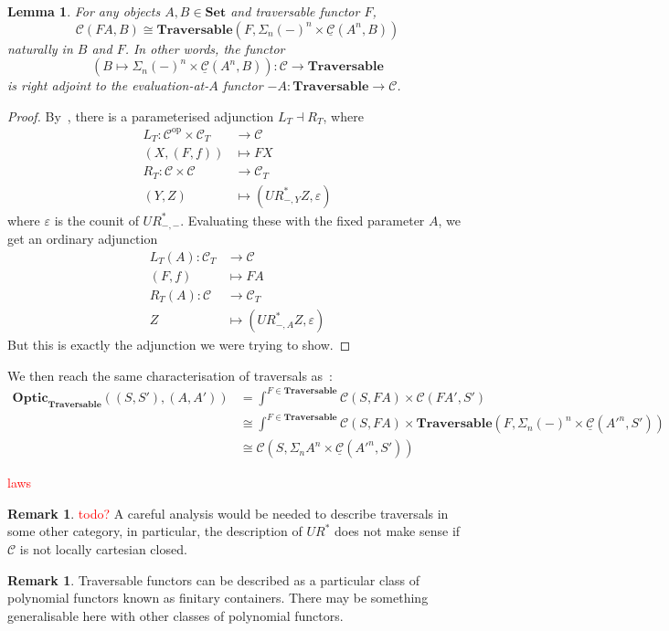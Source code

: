 \documentclass[11pt,a4paper]{article}
\theoremstyle{plain}
\newtheorem{lemma}[theorem]{Lemma}
\theoremstyle{definition}
\newtheorem{remark}[theorem]{Remark}
\newcommand{\C}{\mathscr{C}}
\newcommand{\homC}{\underline{\C}}
\newcommand{\Set}{\mathbf{Set}}
\newcommand{\Traversable}{\mathbf{Traversable}}
\newcommand{\Optic}{\mathbf{Optic}}
\newcommand{\op}{\mathrm{op}}
\newcommand{\todo}[1]{\textcolor{red}{\small #1}}
\begin{document}
\begin{lemma}
  For any objects $A, B \in \Set$ and traversable functor $F$, \[\C(FA, B) \cong \Traversable(F, \Sigma_n (-)^n \times \homC(A^n,B))\]
naturally in $B$ and $F$. In other words, the functor \[(B \mapsto \Sigma_n (-)^n \times \homC(A^n,B)) : \C \to \Traversable\] is right adjoint to the evaluation-at-$A$ functor $-A : \Traversable \to \C$.
\end{lemma}
\begin{proof}
By~\cite[Proposition 6]{AlgebrasForParameterisedMonads}, there is a parameterised adjunction $L_T \dashv R_T$, where
\begin{align*}
L_T : \C^\op \times \C_T &\to \C \\
(X, (F, f)) &\mapsto FX \\
R_T : \C \times \C &\to \C_T \\
(Y, Z) &\mapsto (UR^*_{-, Y} Z, \varepsilon)
\end{align*}
where $\varepsilon$ is the counit of $UR^*_{-, -}$. Evaluating these with the fixed parameter $A$, we get an ordinary adjunction 
\begin{align*}
L_T(A) : \C_T &\to \C \\
(F, f) &\mapsto FA \\
R_T(A) : \C &\to \C_T \\
Z &\mapsto (UR^*_{-, A} Z, \varepsilon)
\end{align*}
But this is exactly the adjunction we were trying to show.
\end{proof}

We then reach the same characterisation of traversals as~\cite{ProfunctorOptics}:
\begin{align*}
\Optic_\Traversable((S, S'), (A, A')) &= \int^{F \in \Traversable} \C(S, F A) \times \C(F A', S') \\
&\cong \int^{F \in \Traversable} \C(S, F A) \times \Traversable(F, \Sigma_n (-)^n \times \homC(A'^n,S')) \\
&\cong \C(S, \Sigma_n A^n \times \homC(A'^n,S'))
\end{align*}

\todo{laws}

\begin{remark}
\todo{todo?} A careful analysis would be needed to describe traversals in some other category, in particular, the description of $UR^*$ does not make sense if $\C$ is not locally cartesian closed.
\end{remark}

\begin{remark}
Traversable functors can be described as a particular class of polynomial functors known as finitary containers. There may be something generalisable here with other classes of polynomial functors.
\end{remark}
\end{document}
